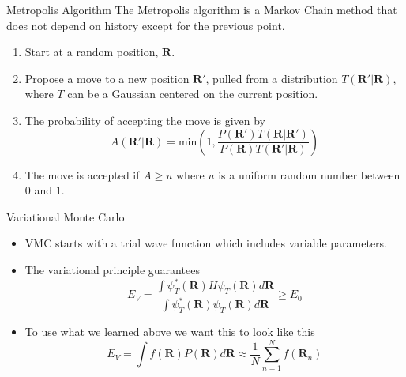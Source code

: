 \documentclass{beamer}
\newcommand{\R}{\mathbf{R}}
\begin{document}
\begin{frame}{Metropolis Algorithm}
   The Metropolis algorithm is a Markov Chain method that does not depend on history except for the previous point.
\begin{enumerate}
   \item Start at a random position, $\R$.
   \item Propose a move to a new position $\R'$, pulled from a distribution $T(\R'|\R)$, where $T$ can be a Gaussian centered on the current position. %
   \item The probability of accepting the move is given by
   \begin{equation*}
      A(\R'|\R) = \mathrm{min}\left(1,\frac{P(\R')T(\R|\R')}{P(\R)T(\R'|\R)}\right)
   \end{equation*}
   \item The move is accepted if $A\ge u$ where $u$ is a uniform random number between 0 and 1.
\end{enumerate}
\end{frame}

\begin{frame}{Variational Monte Carlo}
\begin{itemize}
   \item VMC starts with a trial wave function which includes variable parameters.
   \item The variational principle guarantees
   \begin{equation*}
      E_V = \frac{\int\psi_T^*(\R)H\psi_T(\R)d\R}{\int\psi_T^*(\R)\psi_T(\R)d\R} \ge E_0
   \end{equation*}
   \item To use what we learned above we want this to look like this
   \begin{equation*}
      E_V = \int f(\R)P(\R) d\R \approx \frac{1}{N}\sum\limits_{n=1}^N f(\R_n)
   \end{equation*}
\end{itemize}
\end{frame}
\end{document}
